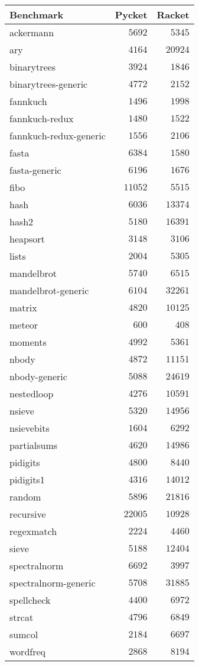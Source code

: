 %
\begin{table}[!tbp]
{\small
\begin{tabular}{l@{}r@{}r}
\toprule
\multicolumn{1}{l}{Benchmark}&\multicolumn{1}{c}{Pycket}&\multicolumn{1}{c}{Racket}\tabularnewline
\midrule
ackermann&$ 5692$&$ 5345$\tabularnewline
ary&$ 4164$&$20924$\tabularnewline
binarytrees&$ 3924$&$ 1846$\tabularnewline
binarytrees-generic&$ 4772$&$ 2152$\tabularnewline
fannkuch&$ 1496$&$ 1998$\tabularnewline
fannkuch-redux&$ 1480$&$ 1522$\tabularnewline
fannkuch-redux-generic&$ 1556$&$ 2106$\tabularnewline
fasta&$ 6384$&$ 1580$\tabularnewline
fasta-generic&$ 6196$&$ 1676$\tabularnewline
fibo&$11052$&$ 5515$\tabularnewline
hash&$ 6036$&$13374$\tabularnewline
hash2&$ 5180$&$16391$\tabularnewline
heapsort&$ 3148$&$ 3106$\tabularnewline
lists&$ 2004$&$ 5305$\tabularnewline
mandelbrot&$ 5740$&$ 6515$\tabularnewline
mandelbrot-generic&$ 6104$&$32261$\tabularnewline
matrix&$ 4820$&$10125$\tabularnewline
meteor&$  600$&$  408$\tabularnewline
moments&$ 4992$&$ 5361$\tabularnewline
nbody&$ 4872$&$11151$\tabularnewline
nbody-generic&$ 5088$&$24619$\tabularnewline
nestedloop&$ 4276$&$10591$\tabularnewline
nsieve&$ 5320$&$14956$\tabularnewline
nsievebits&$ 1604$&$ 6292$\tabularnewline
partialsums&$ 4620$&$14986$\tabularnewline
pidigits&$ 4800$&$ 8440$\tabularnewline
pidigits1&$ 4316$&$14012$\tabularnewline
random&$ 5896$&$21816$\tabularnewline
recursive&$22005$&$10928$\tabularnewline
regexmatch&$ 2224$&$ 4460$\tabularnewline
sieve&$ 5188$&$12404$\tabularnewline
spectralnorm&$ 6692$&$ 3997$\tabularnewline
spectralnorm-generic&$ 5708$&$31885$\tabularnewline
spellcheck&$ 4400$&$ 6972$\tabularnewline
strcat&$ 4796$&$ 6849$\tabularnewline
sumcol&$ 2184$&$ 6697$\tabularnewline
wordfreq&$ 2868$&$ 8194$\tabularnewline
\bottomrule
\end{tabular}
}
\end{table}


